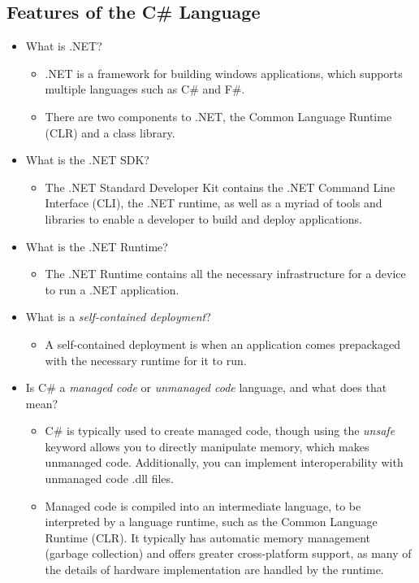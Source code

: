 \documentclass{article}
\begin{document}
\subsection{Features of the C\# Language}
\begin{itemize}
    \item What is .NET?
    \begin{itemize}
        \item .NET is a framework for building windows applications, which supports multiple languages such as C\# and F\#.
        \item There are two components to .NET, the Common Language Runtime (CLR) and a class library.
    \end{itemize}
    \item What is the .NET SDK?
    \begin{itemize}
        \item The .NET Standard Developer Kit contains the .NET Command Line Interface (CLI), the .NET runtime, as well as a myriad of tools and libraries to enable a developer to build and deploy applications. 
    \end{itemize}
    \item What is the .NET Runtime?
    \begin{itemize}
        \item The .NET Runtime contains all the necessary infrastructure for a device to run a .NET application.
    \end{itemize}
        \item What is a \textit{self-contained deployment}?
    \begin{itemize}
        \item A self-contained deployment is when an application comes prepackaged with the necessary runtime for it to run.
    \end{itemize}
    \item Is C\# a \textit{managed code} or \textit{unmanaged code} language, and what does that mean?
    \begin{itemize}
        \item C\# is typically used to create managed code, though using the \textit{unsafe} keyword allows you to directly manipulate memory, which makes unmanaged code. Additionally, you can implement interoperability with unmanaged code .dll files.
        \item Managed code is compiled into an intermediate language, to be interpreted by a language runtime, such as the Common Language Runtime (CLR). It typically has automatic memory management (garbage collection) and offers greater cross-platform support, as many of the details of hardware implementation are handled by the runtime.

\end{itemize}
\end{itemize}
\end{document}
